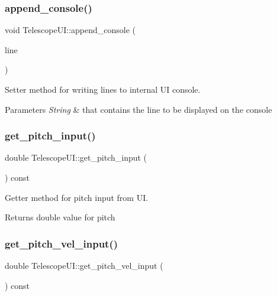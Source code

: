 \subsubsection{\texorpdfstring{append\+\_\+console()}{append\_console()}}
{\footnotesize\ttfamily void Telescope\+U\+I\+::append\+\_\+console (\begin{DoxyParamCaption}\item[{std\+::string}]{line }\end{DoxyParamCaption})}



Setter method for writing lines to internal UI console. 


\begin{DoxyParams}{Parameters}
{\em String} & that contains the line to be displayed on the console \\
\hline
\end{DoxyParams}
\mbox{\label{classTelescopeUI_a874796893c7941992ed16760d62409c5}} 
\subsubsection{\texorpdfstring{get\+\_\+pitch\+\_\+input()}{get\_pitch\_input()}}
{\footnotesize\ttfamily double Telescope\+U\+I\+::get\+\_\+pitch\+\_\+input (\begin{DoxyParamCaption}{ }\end{DoxyParamCaption}) const}



Getter method for pitch input from UI. 

\begin{DoxyReturn}{Returns}
double value for pitch 
\end{DoxyReturn}
\mbox{\label{classTelescopeUI_a1d2675c14ee541617257b68cef48b857}} 
\subsubsection{\texorpdfstring{get\+\_\+pitch\+\_\+vel\+\_\+input()}{get\_pitch\_vel\_input()}}
{\footnotesize\ttfamily double Telescope\+U\+I\+::get\+\_\+pitch\+\_\+vel\+\_\+input (\begin{DoxyParamCaption}{ }\end{DoxyParamCaption}) const}



